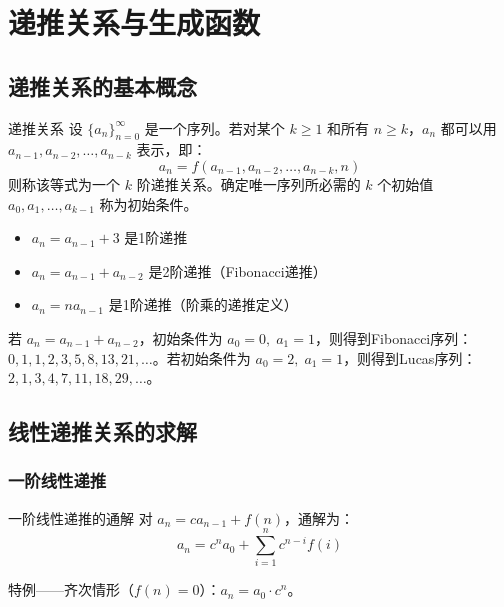 \chapter{递推关系与生成函数}

\section{递推关系的基本概念}

\begin{mydefinition}{递推关系}
设 \(\{a_n\}_{n=0}^{\infty}\) 是一个序列。若对某个 \(k \geq 1\) 和所有 \(n \geq k\)，\(a_n\) 都可以用 \(a_{n-1},a_{n-2},\dots,a_{n-k}\) 表示，即：
\[
a_n = f(a_{n-1},a_{n-2},\dots,a_{n-k},n)
\]
则称该等式为一个 \(k\) 阶递推关系。确定唯一序列所必需的 \(k\) 个初始值 \(a_0,a_1,\dots,a_{k-1}\) 称为初始条件。
\end{mydefinition}

\begin{example}
\begin{itemize}
    \item \(a_n = a_{n-1} + 3\) 是1阶递推
    \item \(a_n = a_{n-1} + a_{n-2}\) 是2阶递推（Fibonacci递推）
    \item \(a_n = na_{n-1}\) 是1阶递推（阶乘的递推定义）
\end{itemize}
\end{example}

若 \(a_n = a_{n-1} + a_{n-2}\)，初始条件为 \(a_0=0,\;a_1=1\)，则得到Fibonacci序列：\(0,1,1,2,3,5,8,13,21,\dots\)。若初始条件为 \(a_0=2,\;a_1=1\)，则得到Lucas序列：\(2,1,3,4,7,11,18,29,\dots\)。

\section{线性递推关系的求解}

\subsection{一阶线性递推}

\begin{myTheorem}{一阶线性递推的通解}
对 \(a_n = c a_{n-1} + f(n)\)，通解为：
\[
a_n = c^n a_0 + \sum_{i=1}^{n} c^{n-i} f(i)
\]
\end{myTheorem}

特例——齐次情形（\(f(n)=0\)）：\(a_n = a_0 \cdot c^n\)。

